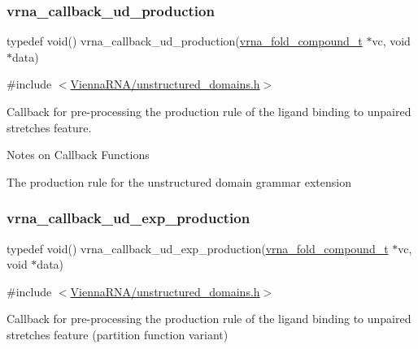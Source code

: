 \subsubsection{\texorpdfstring{vrna\+\_\+callback\+\_\+ud\+\_\+production}{vrna\_callback\_ud\_production}}
{\footnotesize\ttfamily typedef void() vrna\+\_\+callback\+\_\+ud\+\_\+production(\hyperlink{group__fold__compound_ga1b0cef17fd40466cef5968eaeeff6166}{vrna\+\_\+fold\+\_\+compound\+\_\+t} $\ast$vc, void $\ast$data)}



{\ttfamily \#include $<$\hyperlink{unstructured__domains_8h}{Vienna\+R\+N\+A/unstructured\+\_\+domains.\+h}$>$}



Callback for pre-\/processing the production rule of the ligand binding to unpaired stretches feature. 

\begin{DoxyRefDesc}{Notes on Callback Functions}
\item[\hyperlink{callbacks__callbacks000008}{Notes on Callback Functions}]The production rule for the unstructured domain grammar extension \end{DoxyRefDesc}
\mbox{\label{group__domains__up_ga33d78327dcd04c1ca5ab2887edc18c7b}} 
\subsubsection{\texorpdfstring{vrna\+\_\+callback\+\_\+ud\+\_\+exp\+\_\+production}{vrna\_callback\_ud\_exp\_production}}
{\footnotesize\ttfamily typedef void() vrna\+\_\+callback\+\_\+ud\+\_\+exp\+\_\+production(\hyperlink{group__fold__compound_ga1b0cef17fd40466cef5968eaeeff6166}{vrna\+\_\+fold\+\_\+compound\+\_\+t} $\ast$vc, void $\ast$data)}



{\ttfamily \#include $<$\hyperlink{unstructured__domains_8h}{Vienna\+R\+N\+A/unstructured\+\_\+domains.\+h}$>$}



Callback for pre-\/processing the production rule of the ligand binding to unpaired stretches feature (partition function variant) 

